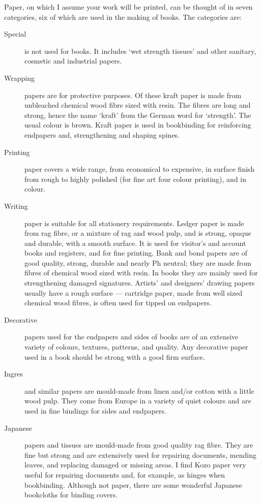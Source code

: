 \documentclass[10pt,a4paper,oneside,extrafontsizes]{memoir}%
\begin{document}
\begin{paracol}{2}
\switchEng
    Paper, on which I assume your work will be printed, can be thought of
in seven categories, six of which are used in the making of books. The 
categories are: 
\begin{description}
\item[Special] is not used for books. 
It includes `wet strength tissues' and
other sanitary, cosmetic and industrial papers.
\item[Wrapping] papers are for protective purposes. 
Of these kraft paper is made from
unbleached chemical wood fibre sized with resin. The fibres are long and 
strong, hence the name `kraft' from the German word for `strength'. The usual
colour is brown. Kraft paper is used in bookbinding for reinforcing endpapers
and, strengthening and shaping spines.
\item[Printing] paper covers a wide range, 
from economical to expensive,
in surface finish from rough to highly polished (for fine art four colour
printing), and in colour.
\item[Writing] paper is suitable for all stationery 
requirements. Ledger
paper is made from rag fibre, or a mixture of rag and wood pulp, 
and is strong, opaque and durable, with a smooth
surface. It is used for visitor's and account books and registers, and for
fine printing. Bank and bond papers are of good quality, strong, durable 
and nearly Ph neutral; they are made from fibres of chemical wood
sized with resin. In books they are mainly used for strengthening damaged
signatures. Artists' and designers' drawing papers usually have a rough 
surface --- cartridge paper, made from well sized chemical wood fibres, 
is often used for tipped on endpapers.
\item[Decorative] papers used for the endpapers 
and sides of books are 
of an extensive variety of colours, textures, patterns, and quality. Any
decorative paper used in a book should be strong with a good firm surface.
\item[Ingres] and similar papers are mould-made 
from linen and/or cotton 
with a little
wood pulp. They come from Europe in a variety of quiet colours and are 
used in fine bindings for sides and endpapers.
\item[Japanese] papers and tissues are mould-made 
from good quality rag fibre.
They are fine but strong and are extensively used for repairing documents,
mending leaves, and replacing damaged or missing areas. I find 
Kozo paper very useful for repairing documents and, for 
example, as hinges when bookbinding. Although not paper, there are some 
wonderful Japanese bookcloths for binding covers.
\end{description}
\end{paracol}
\end{document}
